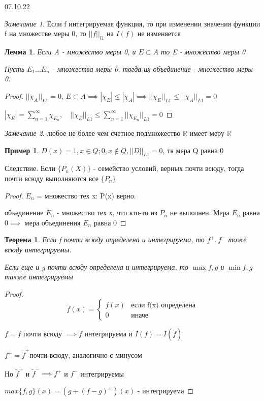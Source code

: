 \documentclass[a4paper, 12pt]{article}
\newtheorem{theorem}{Теорема}[section]
\newtheorem{lemma}{Лемма}[section]
\theoremstyle{definition}
\newtheorem*{example}{Пример}
\theoremstyle{remark}
\newtheorem*{remark}{Замечание}
\begin{document}
07.10.22
\begin{remark}
     Если f интегрируемая функция, то при изменении значения функции f на множестве меры 0, то $||f||_{l1}$ на $I(f)$ не изменяется
\end{remark}
\begin{lemma}
     Если A - множество меры 0, и $E\subset A$ то E - множество меры 0
     
     Пусть $E_1...E_n$ -  множества меры 0, тогда их объединение - множество меры 0.
\end{lemma}
\begin{proof}
     $||\chi_A||_{L1} = 0$, $E\subset A\implies |\chi_E|\leq |\chi_A|\implies ||\chi_E||_{L1}\leq ||\chi_A||_{L1} = 0$

     $|\chi_E| = \sum_{n = 1}^{\infty} \chi_{E_n}, \quad ||\chi_E||_{L1} \leq\sum_{n = 1}^{\infty} ||\chi_{E_n}||_{L1} = 0$
\end{proof}

\begin{remark}
     любое не более чем счетное подмножество $\mathbb{R} $ имеет меру $\mathbb{R} $
\end{remark}
\begin{example}
     $D(x) = 1, x\in Q; 0, x\notin Q, ||D||_{L1} = 0$, тк мера Q равна 0
\end{example}
Следствие. Если $\{P_n(X)\}$ - семейство условий, верных почти всюду, тогда почти всюду выполняются все $\{P_n\}$
\begin{proof}
     $E_n$ = множество тех x: P(x) верно.

     объединение $E_n$ -  множество тех х, что кто-то из $P_n$ не выполнен. Мера $E_n$ равна $0\implies$ мера объединения $E_n$ равна 0
\end{proof}
\begin{theorem}
     Если f почти всюду определена и интегрируема, то $f^+, f^-$ тоже всюду интегрируемы.

     Если еще и g почти всюду определена и интегрируема, то $\max{f, g}$ и $\min{f, g}$ также интегрируемы
\end{theorem}
\begin{proof}
     
     \begin{equation*}
          \text{$\widetilde{f}(x) = $}
          \begin{cases}
               f(x) & \text{если f(x) определена} \\
               0 & \text{иначе}
          \end{cases}
     \end{equation*}
     

     $ f = \widetilde{f}$ почти всюду $\implies \widetilde{f}$ интегрируема и $I(f) = I(\widetilde{f})$

     $f^+ = \widetilde{f}^+$почти всюду, аналогично с минусом

     Но $\widetilde{f}^+$ и $\widetilde{f}^-\implies f^+ $ и $f^-$ интегрируемы 

     $max\{f, g\}(x) = (g+(f-g)^+)(x)$ - интегрируема
\end{proof}
\end{document}
